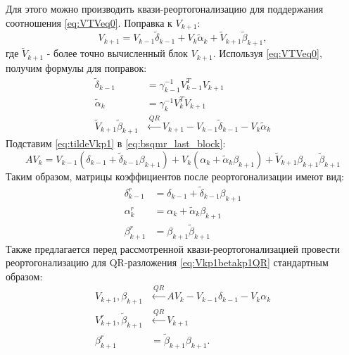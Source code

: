 \par Для этого можно производить квази-реортогонализацию для поддержания соотношения \eqref{eq:VTVeq0}.
Поправка к $V_{k+1}$:
\begin{equation}
    \label{eq:tildeVkp1}
    V_{k+1} = V_{k-1} \tilde{\delta}_{k-1} + V_k \tilde{\alpha}_k + \tilde{V}_{k+1} \tilde{\beta}_{k+1},
\end{equation}
где $\tilde{V}_{k+1}$ - более точно вычисленный блок $V_{k+1}$. Используя \eqref{eq:VTVeq0}, получим формулы для поправок:
\begin{align}
    \tilde{\delta}_{k-1} &= \gamma_{k-1}^{-1} V_{k-1}^T V_{k+1} \label{eq:deltatilda} \\
    \tilde{\alpha}_{k}   &= \gamma_{k}^{-1} V_{k}^T V_{k+1} \label{eq:alphatilda} \\
    \tilde{V}_{k+1} \tilde{\beta}_{k+1} &\xleftarrow{QR} V_{k+1} - V_{k-1} \tilde{\delta}_{k-1} - V_{k} \tilde{\alpha}_k \label{rq:betatilda}
\end{align}
Подставим \eqref{eq:tildeVkp1} в \eqref{eq:bsqmr_last_block}:
\begin{equation}
    \label{eq:bsqmriterreorth}
    AV_{k} = V_{k-1} ( \delta_{k-1} + \tilde{\delta}_{k-1} \beta_{k+1}) + V_k (\alpha_k + \tilde{\alpha}_k \beta_{k+1}) + \tilde{V}_{k+1} \beta_{k+1} \tilde{\beta}_{k+1}
\end{equation} 
Таким образом, матрицы коэффициентов после реортогонализации имеют вид:
\begin{align}
    \delta_{k-1}^r &= \delta_{k-1} + \tilde{\delta}_{k-1} \beta_{k+1} \\
    \alpha_{k}^r   &= \alpha_k + \tilde{\alpha}_k \beta_{k+1} \\
    \beta_{k+1}^r  &= \beta_{k+1} \tilde{\beta}_{k+1}
\end{align}
Также предлагается перед рассмотренной квази-реортогонализацией провести реортогонализацию для
QR-разложения \eqref{eq:Vkp1betakp1QR} стандартным образом: 
\begin{align}
    V_{k+1}, \beta_{k+1} &\xleftarrow{QR} A V_k - V_{k-1} \delta_{k-1} - V_k \alpha_k \\
    V_{k+1}^r, \tilde{\beta}_{k+1} &\xleftarrow{QR} V_{k+1} \\
    \beta_{k+1}^r &= \tilde{\beta}_{k+1} \beta_{k+1}.
\end{align}

